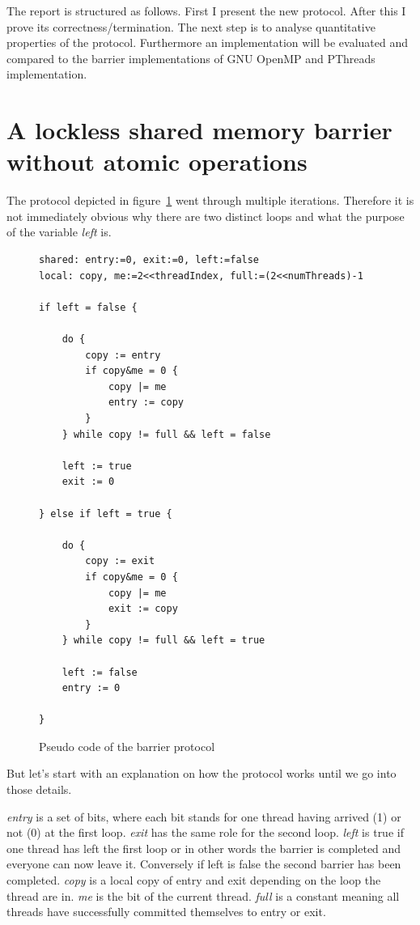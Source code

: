 \documentclass[a4paper, 10pt]{article}
\begin{document}
The report is structured as follows. First I present the new protocol. After this I prove its correctness/termination. The next step is to analyse quantitative properties of the protocol. Furthermore an implementation will be evaluated and compared to the barrier implementations of GNU OpenMP\cite{gomp} and PThreads\cite{glibc} implementation.

\section{A lockless shared memory barrier without atomic operations}
The protocol depicted in figure~\ref{fig:barrier-source-code} went through multiple iterations. Therefore it is not immediately obvious why there are two distinct loops and what the purpose of the variable \emph{left} is.
\begin{figure}[htbp]
	\centering
	\begin{lstlisting}
shared: entry:=0, exit:=0, left:=false
local: copy, me:=2<<threadIndex, full:=(2<<numThreads)-1

if left = false {

	do {
		copy := entry
		if copy&me = 0 {
			copy |= me
			entry := copy
		}
	} while copy != full && left = false

	left := true
	exit := 0

} else if left = true {

	do {
		copy := exit
		if copy&me = 0 {
			copy |= me
			exit := copy
		}
	} while copy != full && left = true

	left := false
	entry := 0

}
	\end{lstlisting}
	\caption{Pseudo code of the barrier protocol}
	\label{fig:barrier-source-code}
\end{figure}
But let's start with an explanation on how the protocol works until we go into those details.

\emph{entry} is a set of bits, where each bit stands for one thread having arrived (1) or not (0) at the first loop. \emph{exit} has the same role for the second loop. \emph{left} is true if one thread has left the first loop or in other words the barrier is completed and everyone can now leave it. Conversely if left is false the second barrier has been completed. \emph{copy} is a local copy of entry and exit depending on the loop the thread are in. \emph{me} is the bit of the current thread. \emph{full} is a constant meaning all threads have successfully committed themselves to entry or exit.
\end{document}
